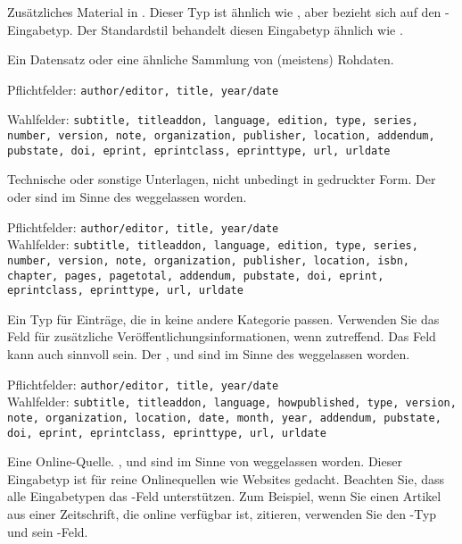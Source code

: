 \documentclass{ltxdockit}[2011/03/25]
\begin{document}
\begin{typelist}

Zusätzliches Material in . Dieser Typ ist ähnlich wie
, aber bezieht sich auf den -Eingabetyp.
Der Standardstil behandelt diesen Eingabetyp ähnlich wie . 


Ein Datensatz oder eine ähnliche Sammlung von (meistens) Rohdaten.

Pflichtfelder: \texttt{author/editor, title, year/date}

Wahlfelder: \texttt{subtitle, titleaddon, language, edition, type, series, number, version, note, organization, publisher, location, addendum, pubstate, doi, eprint, eprintclass, eprinttype, url, urldate}



Technische oder sonstige Unterlagen, nicht unbedingt in
gedruckter Form. Der  oder  sind im Sinne des
 weggelassen worden. 

Pflichtfelder: \texttt{author/editor, title, year/date}\\ Wahlfelder:
\texttt{subtitle, titleaddon,
language, edition, type, series, number, version, note, organization, publisher,
location, isbn, chapter, pages, pagetotal, addendum, pubstate, doi, eprint,
eprintclass, eprinttype, url, urldate}


Ein Typ für Einträge, die in keine andere Kategorie passen.
Verwenden Sie das Feld  für zusätzliche
Veröffentlichungsinformationen, wenn zutreffend. Das Feld  kann
auch sinnvoll sein. Der ,  und 
sind im Sinne des  weggelassen worden. 

Pflichtfelder: \texttt{author/editor, title, year/date}\\ Wahlfelder:
\texttt{subtitle, titleaddon,
language, howpublished, type, version, note, organization, location, date,
month, year, addendum, pubstate,\\ doi, eprint, eprintclass, eprinttype, url,
urldate}


Eine Online-Quelle. ,  und
 sind im Sinne von  weggelassen worden.
Dieser Eingabetyp ist für reine Onlinequellen wie Websites gedacht. Beachten
Sie, dass alle Eingabetypen das -Feld unterstützen. Zum Beispiel,
wenn Sie einen Artikel aus einer Zeitschrift, die online verfügbar ist,
zitieren, verwenden Sie den -Typ und sein -Feld. 


\end{typelist}
\end{document}
